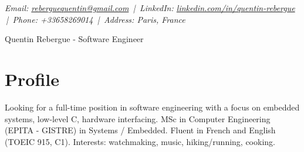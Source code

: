 \documentclass[9pt,a4paper]{article}
\newcommand{\namefont}{\fontsize{18}{22}\selectfont}
\newcommand{\tinyscript}{\fontsize{8}{8}\selectfont}
\begin{document}
\renewcommand\normalsize{\fontsize{10.5}{15}\selectfont}
\normalsize

\begin{center}
  {\tinyscript\itshape
  Email: \href{mailto:reberguequentin@gmail.com}{reberguequentin@gmail.com} \,|\,
  LinkedIn: \href{https://linkedin.com/in/quentin-rebergue}{linkedin.com/in/quentin-rebergue} \,|\,
  Phone: +33658269014 \,|\,
  Address: Paris, France}
\end{center}

\begin{center}
  {\namefont Quentin Rebergue - Software Engineer}
\end{center}

\section*{Profile}
\begin{tcolorbox}[mybox2]
Looking for a full-time position in software engineering with a focus on embedded systems, low-level C, hardware interfacing. MSc in Computer Engineering (EPITA - GISTRE) in Systems / Embedded. Fluent in French and English (TOEIC 915, C1). Interests: watchmaking, music, hiking/running, cooking.
\end{tcolorbox}
\end{document}
